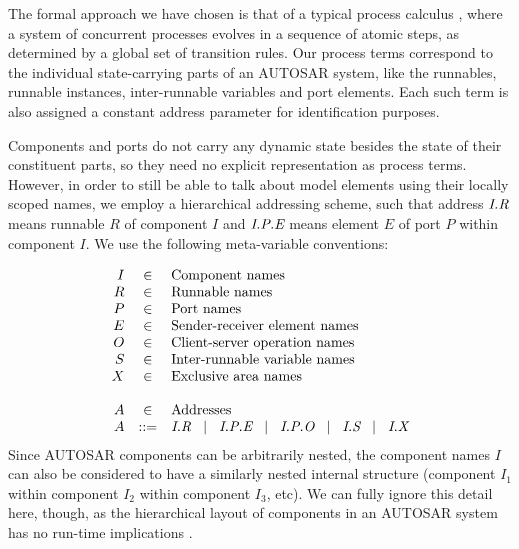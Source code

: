 \documentclass[twocolumn]{article}
\begin{document}

The formal approach we have chosen is that of a typical process calculus \cite{TODO}, where a system of concurrent processes evolves in a sequence of atomic steps, as determined by a global set of transition rules. Our process terms correspond to the individual state-carrying parts of an AUTOSAR system, like the runnables, runnable instances, inter-runnable variables and port elements. Each such term is also assigned a constant address parameter for identification purposes.

Components and ports do not carry any dynamic state besides the state of their constituent parts, so they need no explicit representation as process terms. However, in order to still be able to talk about model elements using their locally scoped names, we employ a hierarchical addressing scheme, such that address $\Tr{R}{I}$ means runnable $R$ of component $I$ and $\Tep{E}{P}{I}$ means element $E$ of port $P$ within component $I$. We use the following meta-variable conventions:

%
\[
\begin{array}{rcll}
  I & \in & \text{Component names} \\
  R & \in & \text{Runnable names} \\
  P & \in & \text{Port names} \\
  E & \in & \text{Sender-receiver element names} \\
  O & \in & \text{Client-server operation names} \\
  S & \in & \text{Inter-runnable variable names} \\
  X & \in & \text{Exclusive area names} \\
\\
  A & \in & \text{Addresses} \\
  A & ::= & \Tr{R}{I}   \sep   \Tep{E}{P}{I}   \sep \Top{O}{P}{I}   \sep   \Ts{S}{I}   \sep   \Tx{X}{I}   \\
\end{array}
\]
%
Since AUTOSAR components can be arbitrarily nested, the component names $I$ can also be considered to have a similarly nested internal structure (component $I_1$ within component $I_2$ within component $I_3$, etc). We can fully ignore this detail here, though, as the hierarchical layout of components in an AUTOSAR system has no run-time implications \cite{TODO2}.
\end{document}
